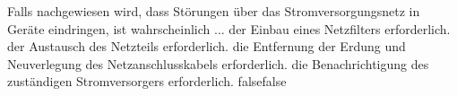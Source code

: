     {Falls nachgewiesen wird, dass Störungen über das Stromversorgungsnetz in Geräte eindringen, ist wahrscheinlich ...}
    {der Einbau eines Netzfilters erforderlich.}
    {der Austausch des Netzteils erforderlich.}
    {die Entfernung der Erdung und Neuverlegung des Netzanschlusskabels erforderlich.}
    {die Benachrichtigung des zuständigen Stromversorgers erforderlich.}
    {false}{false}
